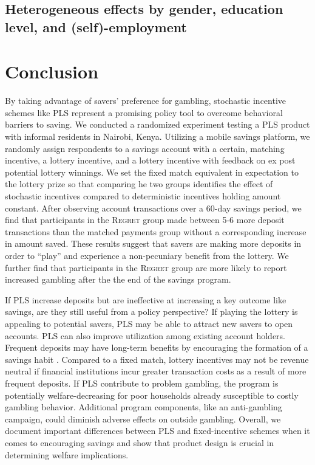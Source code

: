 \documentclass[11pt]{article}
\begin{document}
		

	\subsection{Heterogeneous effects by gender, education level, and (self)-employment}

\section{Conclusion} \label{sec:conclusion}

		By taking advantage of savers' preference for gambling, stochastic incentive schemes like PLS represent a promising policy tool to overcome behavioral barriers to saving. We conducted a randomized experiment testing a PLS product with informal residents in Nairobi, Kenya. Utilizing a mobile savings platform, we randomly assign respondents to a savings account with a certain, matching incentive, a lottery incentive, and a lottery incentive with feedback on ex post potential lottery winnings. We set the fixed match equivalent in expectation to the lottery prize so that comparing he two groups identifies the effect of stochastic incentives compared to deterministic incentives holding amount constant. After observing account transactions over a 60-day savings period, we find that participants in the \textsc{Regret} group made between 5-6 more deposit transactions than the matched payments group without a corresponding increase in amount saved. These results suggest that savers are making more deposits in order to ``play'' and experience a non-pecuniary benefit from the lottery. We further find that participants in the \textsc{Regret} group are more likely to report increased gambling after the the end of the savings program.

		If PLS increase deposits but are ineffective at increasing a key outcome like savings, are they still useful from a policy perspective? If playing the lottery is appealing to potential savers, PLS may be able to attract new savers to open  accounts. PLS can also improve utilization among existing account holders. Frequent deposits may have long-term benefits by encouraging the formation of a savings habit . Compared to a fixed match, lottery incentives may not be revenue neutral if financial institutions incur greater transaction costs as a result of more frequent deposits. If PLS contribute to problem gambling, the program is potentially welfare-decreasing for poor households already susceptible to costly gambling behavior. Additional program components, like an anti-gambling campaign, could diminish adverse effects on outside gambling. Overall, we document important differences between PLS and fixed-incentive schemes when it comes to encouraging savings and show that product design is crucial in determining welfare implications.
\end{document}
